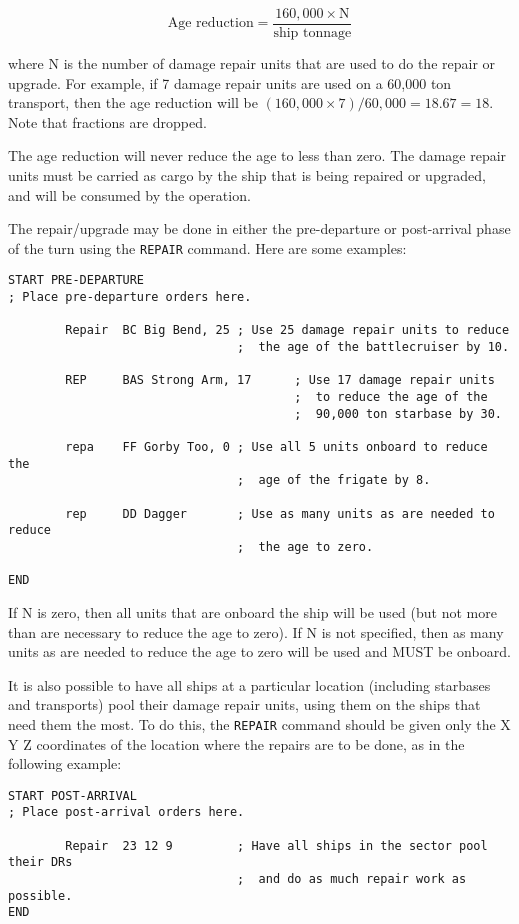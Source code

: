 \documentclass[10pt,titlepage]{article}
\begin{document}
\[
	\textrm{Age reduction}    =    \dfrac{160,000  \times  \textrm{N}}{\textrm{ship tonnage}}
\]


where N is the number of damage repair units that are used to do the repair
or upgrade.  For example, if 7 damage repair units are used on a 60,000 ton
transport, then the age reduction will be $(160,000 \times 7)/60,000 = 18.67 = 18$.
Note that fractions are dropped.

The age reduction will never reduce the age to less than zero.  The damage
repair units must be carried as cargo by the ship that is being repaired or
upgraded, and will be consumed by the operation.

The repair/upgrade may be done in either the pre-departure or post-arrival
phase of the turn using the \texttt{REPAIR} command.  Here are some examples:

\begin{verbatim}
START PRE-DEPARTURE
; Place pre-departure orders here.

        Repair  BC Big Bend, 25 ; Use 25 damage repair units to reduce
                                ;  the age of the battlecruiser by 10.

        REP     BAS Strong Arm, 17      ; Use 17 damage repair units
                                        ;  to reduce the age of the
                                        ;  90,000 ton starbase by 30.

        repa    FF Gorby Too, 0 ; Use all 5 units onboard to reduce the
                                ;  age of the frigate by 8.

        rep     DD Dagger       ; Use as many units as are needed to reduce
                                ;  the age to zero.

END\end{verbatim} 


If N is zero, then all units that are onboard the ship will be used (but not
more than are necessary to reduce the age to zero).  If N is not specified,
then as many units as are needed to reduce the age to zero will be used and
MUST be onboard.

It is also possible to have all ships at a particular location (including
starbases and transports) pool their damage repair units, using them on the
ships that need them the most.  To do this, the \texttt{REPAIR} command should be given
only the X Y Z coordinates of the location where the repairs are to be done,
as in the following example:


\begin{verbatim}
START POST-ARRIVAL
; Place post-arrival orders here.

        Repair  23 12 9         ; Have all ships in the sector pool their DRs
                                ;  and do as much repair work as possible.
END\end{verbatim} 
\end{document}
